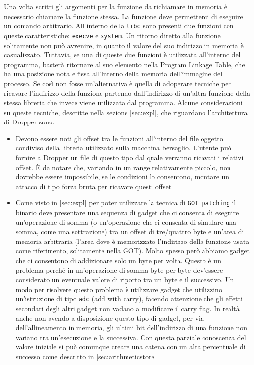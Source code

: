 Una volta scritti gli argomenti per la funzione da richiamare in
memoria è necessario chiamare la funzione stessa. La funzione deve
permetterci di eseguire un comando arbitrario. All'interno della
\lstinline{libc} sono presenti due funzioni con queste
caratteristiche: \lstinline{execve} e \lstinline{system}. Un ritorno
diretto alla funzione solitamente non può avvenire, in quanto il
valore del suo indirizzo in memoria è casualizzato. Tuttavia, se una
di queste due funzioni è utilizzata all'interno del programma, basterà
ritornare al suo elemento nella Program Linkage Table, che ha una
posizione nota e fissa all'interno della memoria dell'immagine del
processo. Se così non fosse un'alternativa è quella di adoperare
tecniche per ricavare l'indirizzo della funzione partendo
dall'indirizzo di un'altra funzione della stessa libreria che invece
viene utilizzata dal programma. Alcune considerazioni su queste
tecniche, descritte nella sezione \ref{sec:expl}, che riguardano
l'architettura di Dropper sono:

\begin{itemize}
  \item Devono essere noti gli offset tra le funzioni all'interno del
    file oggetto condiviso della libreria utilizzato sulla macchina
    bersaglio. L'utente può fornire a Dropper un file di questo tipo
    dal quale verranno ricavati i relativi offset. È da notare che,
    variando in un range relativamente piccolo, non dovrebbe essere
    impossibile, se le condizioni lo consentono, montare un attacco di
    tipo forza bruta per ricavare questi offset

  \item Come visto in \ref{sec:expl} per poter utilizzare la tecnica
    di \lstinline{GOT patching} il binario deve presentare una
    sequenza di gadget che ci consenta di eseguire un'operazione di
    somma (o un'operazione che ci consenta di simulare una somma, come
    una sottrazione) tra un offset di tre/quattro byte e un'area di
    memoria arbitraria (l'area dove è memorizzato l'indirizzo della
    funzione usata come riferimento, solitamente nella GOT). Molto
    spesso però abbiamo gadget che ci consentono di addizionare solo
    un byte per volta. Questo è un problema perché in un'operazione di
    somma byte per byte dev'essere considerato un eventuale valore di
    riporto tra un byte e il successivo. Un modo per risolvere questo
    problema è utilizzare gadget che utilizzino un'istruzione di tipo
    \lstinline{adc} (add with carry), facendo attenzione che gli
    effetti secondari degli altri gadget non vadano a modificare il
    carry flag. In realtà anche non avendo a disposizione questo tipo
    di gadget, per via dell'allineamento in memoria, gli ultimi bit
    dell'indirizzo di una funzione non variano tra un'esecuzione e la
    successiva. Con questa parziale conoscenza del valore iniziale si
    può comunque creare una catena con un alta percentuale di successo
    come descritto in \ref{sec:arithmeticstore}
\end{itemize}


